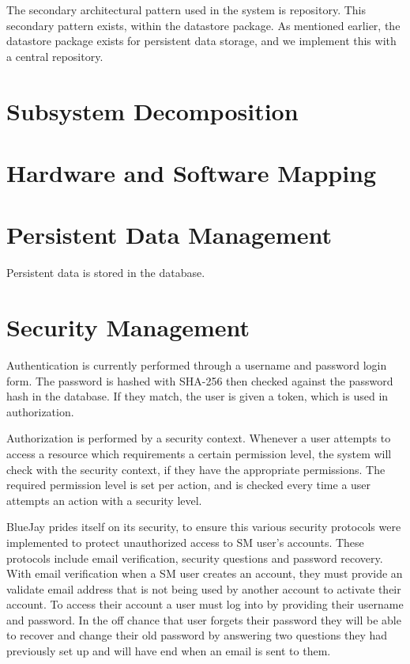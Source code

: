 \documentclass{report}
\begin{document}
The secondary architectural pattern used in the system is repository. This secondary pattern exists, within the datastore package. As mentioned earlier, the datastore package exists for persistent data storage, and we implement this with a central repository.
\section{Subsystem Decomposition}
\section{Hardware and Software Mapping}
\section{Persistent Data Management}
	Persistent data is stored in the database.
	

\section{Security Management}
	Authentication is currently performed through a username and password login form.
	The password is hashed with SHA-256 then checked against the password hash in the database.
	If they match, the user is given a token, which is used in authorization.

	Authorization is performed by a security context.
	Whenever a user attempts to access a resource which requirements a certain permission level,
	the system will check with the security context, if they have the appropriate permissions.
	The required permission level is set per action, and is checked every time
	a user attempts an action with a security level.

	


BlueJay prides itself on its security,
to ensure this various security protocols were implemented to protect unauthorized access to SM user’s accounts.
These protocols include email verification, security questions and password recovery.
With email verification when a SM user creates an account, they must provide an validate email address that is not being used by another account to activate their account.
To access their account a user must log into by providing their username and password.
In the off chance that user forgets their password they will be able to recover and change their old password by answering two questions they had previously set up and will have end when an email is sent to them.\\
\end{document}
